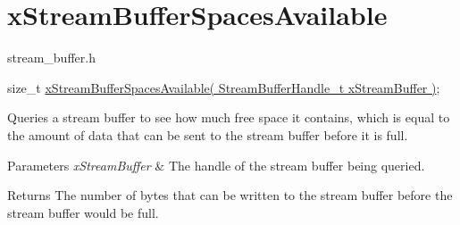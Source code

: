 \hypertarget{group__xStreamBufferSpacesAvailable}{}\section{x\+Stream\+Buffer\+Spaces\+Available}
\label{group__xStreamBufferSpacesAvailable}
stream\+\_\+buffer.\+h


\begin{DoxyPre}
size\_t \hyperlink{stream__buffer_8h_a9a78e0206cb1dc343c329f9db579208d}{xStreamBufferSpacesAvailable( StreamBufferHandle\_t xStreamBuffer )};
\end{DoxyPre}


Queries a stream buffer to see how much free space it contains, which is equal to the amount of data that can be sent to the stream buffer before it is full.


\begin{DoxyParams}{Parameters}
{\em x\+Stream\+Buffer} & The handle of the stream buffer being queried.\\
\hline
\end{DoxyParams}
\begin{DoxyReturn}{Returns}
The number of bytes that can be written to the stream buffer before the stream buffer would be full. 
\end{DoxyReturn}
